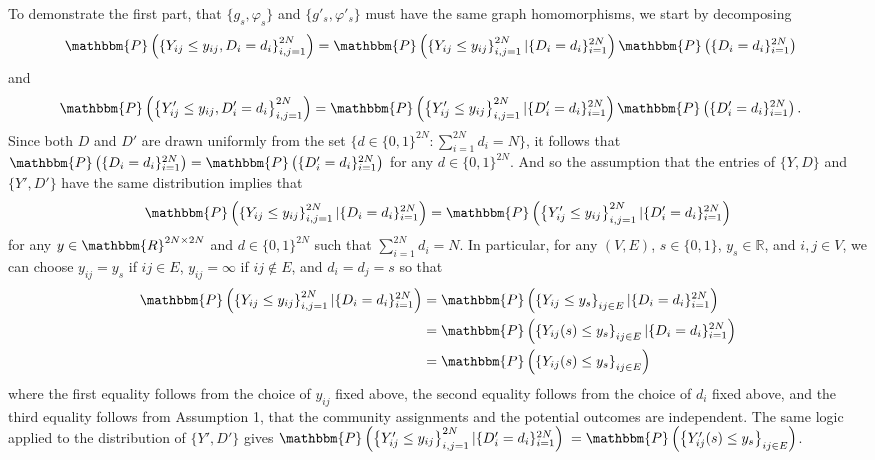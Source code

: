 \documentclass[12pt]{article}
\theoremstyle{definition}
\begin{document}
\begin{flushleft}
To demonstrate the first part, that $\{g_{s},\varphi_s\}$ and $\{g'_{s},\varphi'_s\}$ must have the same graph homomorphisms, we start by decomposing 
\begin{align*}
\mathbbm{P}\left(\left\{Y_{ij} \leq y_{ij}, D_{i} = d_i\right\}_{i,j=1}^{2N}\right) 
&= \mathbbm{P}\left(\left\{Y_{ij} \leq y_{ij}\right\}_{i,j=1}^{2N}|\{D_i = d_i\}_{i=1}^{2N}\right)\mathbbm{P}\left(\{D_i = d_i\}_{i=1}^{2N}\right)  
\end{align*}
and
\begin{align*}
\mathbbm{P}\left(\left\{Y'_{ij} \leq y_{ij}, D'_{i} = d_i\right\}_{i,j=1}^{2N}\right) 
&= \mathbbm{P}\left(\left\{Y'_{ij} \leq y_{ij}\right\}_{i,j=1}^{2N}|\{D'_i = d_i\}_{i=1}^{2N}\right)\mathbbm{P}\left(\{D'_i = d_i\}_{i=1}^{2N}\right). 
\end{align*}
Since both $D$ and $D'$ are drawn uniformly from the set $\{d \in \{0,1\}^{2N}: \sum_{i=1}^{2N}d_i = N\}$, it follows that $\mathbbm{P}\left(\{D_i = d_i\}_{i=1}^{2N}\right) = \mathbbm{P}\left(\{D'_i = d_i\}_{i=1}^{2N}\right)$ for any $d \in \{0,1\}^{2N}$. And so the assumption that the entries of $\{Y,D\}$ and $\{Y',D'\}$ have the same distribution implies that 
\begin{align}\label{conditional}
\mathbbm{P}\left(\left\{Y_{ij} \leq y_{ij}\right\}_{i,j=1}^{2N}|\{D_i = d_i\}_{i=1}^{2N}\right) = \mathbbm{P}\left(\left\{Y'_{ij} \leq y_{ij}\right\}_{i,j=1}^{2N}|\{D'_i = d_i\}_{i=1}^{2N}\right)
\end{align} 
for any $y \in \mathbbm{R}^{2N\times 2N}$ and $d \in \{0,1\}^{2N}$ such that $\sum_{i=1}^{2N}d_i = N$. In particular, for any $(V,E)$, $s \in \{0,1\}$, $y_s \in \mathbb{R}$, and $i,j \in V$, we can choose $y_{ij} = y_s$ if $ij \in E$, $y_{ij} = \infty$ if $ij \not\in E$, and $d_i = d_j = s$ so that
\begin{align*}
\mathbbm{P}\left(\left\{Y_{ij} \leq y_{ij}\right\}_{i,j=1}^{2N}|\{D_i = d_i\}_{i=1}^{2N}\right) 
&= \mathbbm{P}\left(\left\{Y_{ij} \leq y_{s}\right\}_{ij \in E}|\{D_i = d_i\}_{i=1}^{2N}\right)  \\
&=  \mathbbm{P}\left(\left\{Y_{ij}(s) \leq y_{s}\right\}_{ij \in E}|\{D_i = d_i\}_{i=1}^{2N}\right)  \\
&= \mathbbm{P}\left(\left\{Y_{ij}(s) \leq y_{s}\right\}_{ij \in E}\right)
\end{align*} 
where the first equality follows from the choice of $y_{ij}$ fixed above, the second equality follows from the choice of $d_i$ fixed above, and the third equality follows from Assumption 1, that the community assignments and the potential outcomes are independent. The same logic applied to the distribution of $\{Y',D'\}$ gives $\mathbbm{P}\left(\left\{Y'_{ij} \leq y_{ij}\right\}_{i,j=1}^{2N}|\{D'_i = d_i\}_{i=1}^{2N}\right)$ $= \mathbbm{P}\left(\left\{Y'_{ij}(s) \leq y_{s}\right\}_{ij \in E}\right)$.\newline


\end{flushleft}
\end{document}
